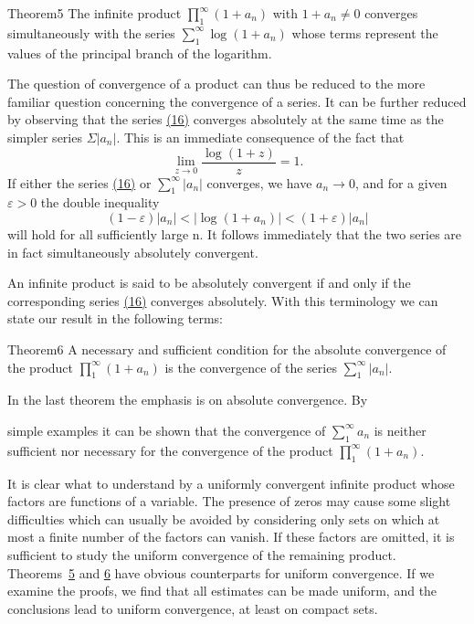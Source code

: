 \begin{originalstatement}{Theorem}{5}\label{thm:5.5}
The infinite product $\prod_{1}^{\infty}(1 + a_n)$ with $1 + a_{n} \neq 0$ converges simultaneously with the series $\sum_{1}^{\infty}\log (1 + a_n)$ whose terms represent the values of the principal branch of the logarithm.
\end{originalstatement}
The question of convergence of a product can thus be reduced to the more familiar question concerning the convergence of a series. It can be further reduced by observing that the series \hyperref[eq:5.16]{(16)} converges absolutely at the same time as the simpler series $\Sigma |a_{n}|$. This is an immediate consequence of the fact that
\begin{equation*}
\lim _ {z \rightarrow 0} \frac {\log (1 + z)}{z} = 1.
\end{equation*}
If either the series \hyperref[eq:5.16]{(16)} or $\sum_{1}^{\infty}|a_n|$ converges, we have $a_{n}\to 0$, and for a given $\varepsilon >0$ the double inequality
\begin{equation*}
(1 - \varepsilon) | a _ {n} | <   | \log (1 + a _ {n}) | <   (1 + \varepsilon) | a _ {n} |
\end{equation*}
will hold for all sufficiently large n. It follows immediately that the two series are in fact simultaneously absolutely convergent.

An infinite product is said to be absolutely convergent if and only if the corresponding series \hyperref[eq:5.16]{(16)} converges absolutely. With this terminology we can state our result in the following terms:

\begin{originalstatement}{Theorem}{6}\label{thm:5.6}
A necessary and sufficient condition for the absolute convergence of the product $\prod_{1}^{\infty}(1 + a_n)$ is the convergence of the series $\sum_{1}^{\infty}|a_n|$.
\end{originalstatement}
In the last theorem the emphasis is on absolute convergence. By


simple examples it can be shown that the convergence of $\sum_{1}^{\infty}a_n$ is neither sufficient nor necessary for the convergence of the product $\prod_{1}^{\infty}(1 + a_n)$.

It is clear what to understand by a uniformly convergent infinite product whose factors are functions of a variable. The presence of zeros may cause some slight difficulties which can usually be avoided by considering only sets on which at most a finite number of the factors can vanish. If these factors are omitted, it is sufficient to study the uniform convergence of the remaining product. Theorems~\hyperref[thm:5.5]{5} and \hyperref[thm:5.6]{6} have obvious counterparts for uniform convergence. If we examine the proofs, we find that all estimates can be made uniform, and the conclusions lead to uniform convergence, at least on compact sets.


